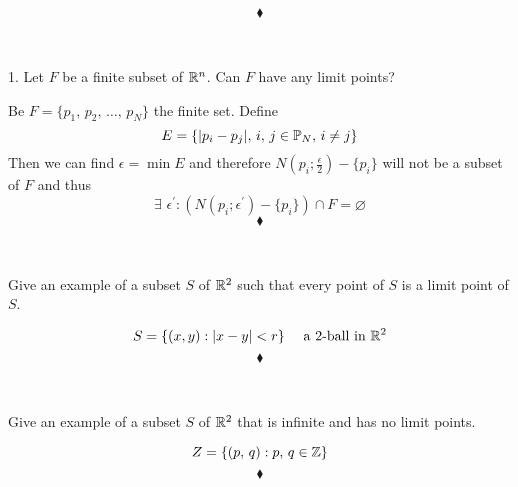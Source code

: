 $$\blacklozenge$$\\


\newpage


\renewcommand{\thesubsection}{\thesection.\arabic{subsection}}
\setcounter{subsection}{0}

\subsection{}
\begin{tcolorbox}
1. Let $F$ be a finite subset of $\mathbb{R}^n$. Can $F$ have any limit points?
\end{tcolorbox}
Be $F=\{p_1,\, p_2,\, \dots ,\, p_N\}$ the finite set. Define 
$$E=\{|p_i-p_j|,\, i,\, j\in \mathbb{P}_N,\, i\neq j\}$$
Then we can find $\epsilon=\min E$ and therefore $N(p_i;\frac{\epsilon}{2})-\{p_i\}$ will not be a subset of $F$ and thus  \\
$$\exists\, \,\epsilon^{'}: \left(N(p_i;\epsilon^{'})-\{p_i\}\right)\cap F=\varnothing$$
$$\blacklozenge$$\\


\subsection{}
\begin{tcolorbox}
Give an example of a subset $S$ of $\mathbb{R}^2$ such that every point of $S$ is a limit point of $S$.
\end{tcolorbox}
$$S=\{(x,y): |x-y|<r\}\quad \text{ a }2\text{-ball in } \mathbb{R}^2$$
$$\blacklozenge$$\\


\subsection{}
\begin{tcolorbox}
Give an example of a subset $S$ of $\mathbb{R}^2$ that is infinite and has no limit points.
\end{tcolorbox}
$$Z=\{(p,\, q):p,\, q\in \mathbb{Z}\}$$
$$\blacklozenge$$\\


